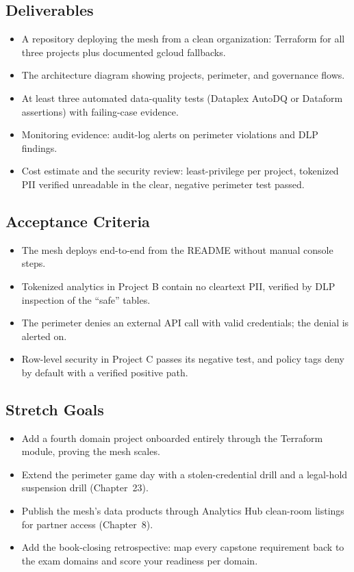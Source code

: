 \subsection*{Deliverables}
\begin{itemize}
    \item A repository deploying the mesh from a clean organization: Terraform for all three projects plus documented gcloud fallbacks.
    \item The architecture diagram showing projects, perimeter, and governance flows.
    \item At least three automated data-quality tests (Dataplex AutoDQ or Dataform assertions) with failing-case evidence.
    \item Monitoring evidence: audit-log alerts on perimeter violations and DLP findings.
    \item Cost estimate and the security review: least-privilege per project, tokenized PII verified unreadable in the clear, negative perimeter test passed.
\end{itemize}

\subsection*{Acceptance Criteria}
\begin{itemize}
    \item The mesh deploys end-to-end from the README without manual console steps.
    \item Tokenized analytics in Project B contain no cleartext PII, verified by DLP inspection of the ``safe'' tables.
    \item The perimeter denies an external API call with valid credentials; the denial is alerted on.
    \item Row-level security in Project C passes its negative test, and policy tags deny by default with a verified positive path.
\end{itemize}

\subsection*{Stretch Goals}
\begin{itemize}
    \item Add a fourth domain project onboarded entirely through the Terraform module, proving the mesh scales.
    \item Extend the perimeter game day with a stolen-credential drill and a legal-hold suspension drill (Chapter~23).
    \item Publish the mesh's data products through Analytics Hub clean-room listings for partner access (Chapter~8).
    \item Add the book-closing retrospective: map every capstone requirement back to the exam domains and score your readiness per domain.
\end{itemize}
